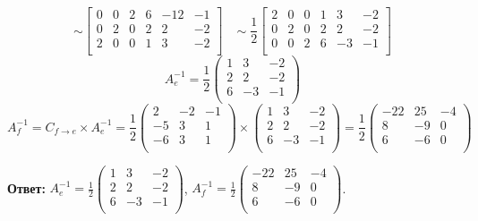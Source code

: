 \documentclass[12pt]{article}
\begin{document}
$$
	\sim
	\left[
		\begin{array}{ccc|ccc}
			0 & 0 & 2 & 6 & -12 & -1 \\
			0 & 2 & 0 & 2 & 2   & -2 \\
			2 & 0 & 0 & 1 & 3   & -2 \\
		\end{array}
		\right]
	\begin{matrix} \\ \\ \\ \end{matrix} \sim
	\frac{1}{2}
	\left[
		\begin{array}{ccc|ccc}
			2 & 0 & 0 & 1 & 3  & -2 \\
			0 & 2 & 0 & 2 & 2  & -2 \\
			0 & 0 & 2 & 6 & -3 & -1 \\
		\end{array}
		\right]
$$
$$
	A_e^{-1} = \frac{1}{2}
	\begin{pmatrix}
		1 & 3  & -2 \\
		2 & 2  & -2 \\
		6 & -3 & -1 \\
	\end{pmatrix}
$$
$$
	A_f^{-1} =
	C_{f \rightarrow e} \times A_e^{-1} = \frac{1}{2}
	\begin{pmatrix}
		2  & -2 & -1 \\
		-5 & 3  & 1  \\
		-6 & 3  & 1  \\
	\end{pmatrix}
	\times
	\begin{pmatrix}
		1 & 3  & -2 \\
		2 & 2  & -2 \\
		6 & -3 & -1 \\
	\end{pmatrix}
	= \frac{1}{2}
	\begin{pmatrix}
		-22 & 25 & -4 \\
		8   & -9 & 0  \\
		6   & -6 & 0  \\
	\end{pmatrix}
$$

\textbf{Ответ:} $A_e^{-1} = \frac{1}{2} \begin{pmatrix} 1 & 3  & -2 \\ 2 & 2  & -2 \\ 6 & -3 & -1 \\ \end{pmatrix}$, $A_f^{-1} = \frac{1}{2} \begin{pmatrix} -22 & 25 & -4 \\ 8   & -9 & 0  \\ 6   & -6 & 0  \\ \end{pmatrix}$.
\end{document}
